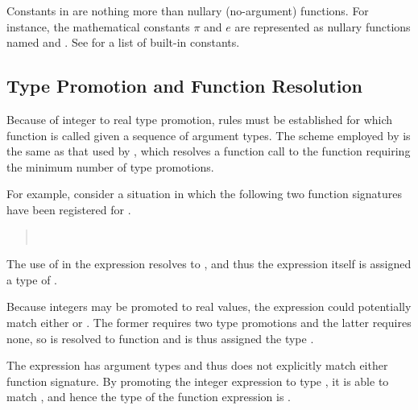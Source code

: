 Constants in \Stan are nothing more than nullary (no-argument)
functions.  For instance, the mathematical constants $\pi$ and $e$ are
represented as nullary functions named  and .
See  for a list of built-in constants.

\subsection{Type Promotion and Function Resolution}

Because of integer to real type promotion, rules must be established
for which function is called given a sequence of argument types.  The
scheme employed by \Stan is the same as that used by \Cpp, which
resolves a function call to the function requiring the minimum number
of type promotions.  

For example, consider a situation in which the following two function
signatures have been registered for .
%
\begin{quote}
\\
\end{quote}
%
The use of  in the expression  resolves
to , and thus the expression 
itself is assigned a type of .  

Because integers may be promoted to real values, the expression
 could potentially match either 
or .  The former requires two type promotions and
the latter requires none, so  is resolved to function
 and is thus assigned the type .

The expression  has argument types 
and thus does not explicitly match either function signature.  By
promoting the integer expression  to type , it is
able to match , and hence the type of the
function expression  is .

